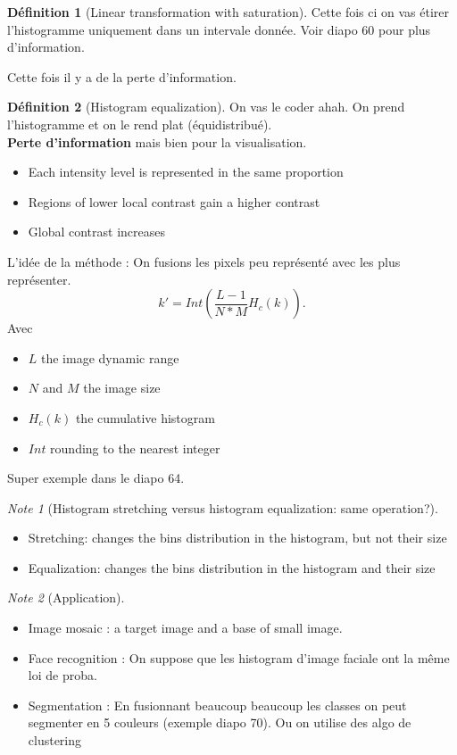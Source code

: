 \documentclass{article}
\theoremstyle{plain}%
\theoremstyle{definition}
\newtheorem{defn}{Définition}[section]
\theoremstyle{remark}
\newtheorem*{note}{Note}
\begin{document}
\begin{defn}[Linear transformation with saturation]
    Cette fois ci on vas étirer l'histogramme uniquement dans un intervale donnée. Voir diapo 60 pour plus d'information.

    Cette fois il y a de la perte d'information.
\end{defn}

\begin{defn}[Histogram equalization]
    On vas le coder ahah. On prend l'histogramme et on le rend plat (équidistribué).\\ 
    \textbf{Perte d'information} mais bien pour la visualisation.
    \begin{itemize}
        \item Each intensity level is represented in the same proportion
        \item Regions of lower local contrast gain a higher contrast
        \item Global contrast increases
    \end{itemize}
    L'idée de la méthode : On fusions les pixels peu représenté avec les plus représenter.
    \[
        k' = Int(\frac{L-1}{N*M}H_c(k))
    .\]
    Avec \begin{itemize}
        \item $ L $ the image dynamic range
        \item $ N $ and $ M $  the image size
        \item $ H_c(k) $ the cumulative histogram
        \item $ Int $ rounding to the nearest integer
    \end{itemize}
    Super exemple dans le diapo 64. 
\end{defn}

\begin{note}[Histogram stretching versus histogram equalization: same operation?]
    \begin{itemize}
        \item Stretching: changes the bins distribution in the histogram, but not their size
        \item Equalization: changes the bins distribution in the histogram and their size
    \end{itemize}
\end{note}

\begin{note}[Application]
    \begin{itemize}
        \item Image mosaic : a target image and a base of small image.
        \item Face recognition : On suppose que les histogram d'image faciale ont la même loi de proba.
        \item Segmentation : En fusionnant beaucoup beaucoup les classes on peut segmenter en 5 couleurs (exemple diapo 70). Ou on utilise des algo de clustering
    \end{itemize}
\end{note}
\end{document}
